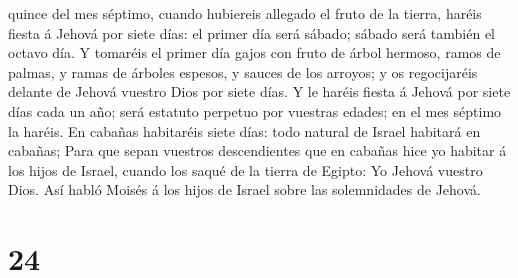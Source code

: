 quince del mes séptimo, cuando hubiereis allegado el fruto de la tierra,
haréis fiesta á Jehová por siete días: el primer día será sábado; sábado
será también el octavo día.  Y tomaréis el primer día
gajos con fruto de árbol hermoso, ramos de palmas, y ramas de árboles
espesos, y sauces de los arroyos; y os regocijaréis delante de Jehová
vuestro Dios por siete días.  Y le haréis fiesta á Jehová
por siete días cada un año; será estatuto perpetuo por vuestras edades;
en el mes séptimo la haréis.  En cabañas habitaréis siete
días: todo natural de Israel habitará en cabañas;  Para
que sepan vuestros descendientes que en cabañas hice yo habitar á los
hijos de Israel, cuando los saqué de la tierra de Egipto: Yo Jehová
vuestro Dios.  Así habló Moisés á los hijos de Israel
sobre las solemnidades de Jehová.

\hypertarget{section-23}{%
\section{24}\label{section-23}}

